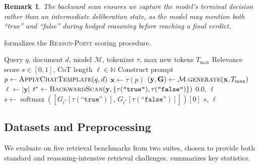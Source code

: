 \documentclass[12pt]{article}
\newtheorem{remark}{Remark}
\newcommand{\reason}{\textsc{Reason-Point}}
\DeclareMathOperator{\softmax}{softmax}
\begin{document}
\begin{remark}
  The backward scan ensures we capture the model's terminal decision rather
  than an intermediate deliberation state, as the model may mention both
  ``true'' and ``false'' during hedged reasoning before reaching a final verdict.
\end{remark}

 formalizes the \reason{} scoring procedure.

\begin{algorithm}[htbp]
\caption{Reason-Point Scoring}
\label{alg:reason}
\begin{algorithmic}[1]
\Require Query $q$, document $d$, model $\mathcal{M}$, tokenizer $\tau$,
         max new tokens $T_{\max}$
\Ensure Relevance score $s \in [0, 1]$, CoT length $\ell \in \mathbb{N}$
\State Construct prompt $p \gets \textsc{ApplyChatTemplate}(q, d)$
\State $\mathbf{x} \gets \tau(p)$ 
\State $(\mathbf{y}, \mathbf{G}) \gets \mathcal{M}\textsc{.generate}(\mathbf{x},
       T_{\max})$ 
\State $\ell \gets |\mathbf{y}|$ 
\State $t^* \gets \textsc{BackwardScan}(\mathbf{y},
       \{\tau(\texttt{``true''}), \tau(\texttt{``false''})\})$
  \State \Return $0.0$, $\ell$
\EndIf
\State $s \gets \softmax\!\left([G_{t^*}[\tau(\texttt{``true''})],\,
                              G_{t^*}[\tau(\texttt{``false''})]]\right)[0]$
\State \Return $s$, $\ell$
\end{algorithmic}
\end{algorithm}

\subsection{Datasets and Preprocessing}
\label{sec:datasets}

We evaluate on five retrieval benchmarks from two suites, chosen to provide
both standard and reasoning-intensive retrieval challenges.
 summarizes key statistics.
\end{document}
